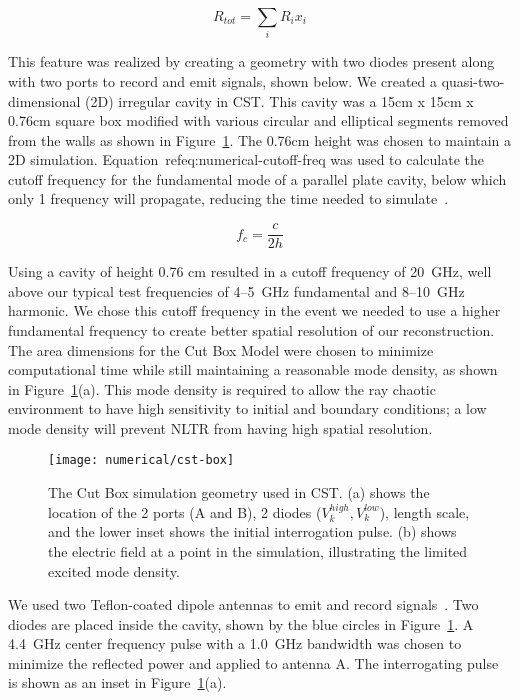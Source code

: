 \begin{equation}
R_{tot} = \sum_{i} R_{i}x_{i}
\label{eq:numerical-r-tot}
\end{equation}

This feature was realized by creating a geometry with two diodes present along with two ports to record and emit signals, shown below. We created a quasi-two-dimensional (2D) irregular cavity in CST. This cavity was a 15cm x 15cm x 0.76cm square box modified with various circular and elliptical segments removed from the walls as shown in Figure~\ref{fig:numerical-cst-box}.  The 0.76cm height was chosen to maintain a 2D simulation. Equation~ref{eq:numerical-cutoff-freq} was used to calculate the cutoff frequency for the fundamental mode of a parallel plate cavity, below which only 1 frequency will propagate, reducing the time needed to simulate~\cite{griffiths_david_introduction_1999}.

\begin{equation}
f_c = \frac{c}{2h}
\label{eq:numerical-cutoff-freq}
\end{equation}

Using a cavity of height 0.76 cm resulted in a cutoff frequency of 20~GHz, well above our typical test frequencies of \numrange{4}{5}~GHz fundamental and \numrange{8}{10}~GHz harmonic. We chose this cutoff frequency in the event we needed to use a higher fundamental frequency to create better spatial resolution of our reconstruction. The area dimensions for the Cut Box Model were chosen to minimize computational time while still maintaining a reasonable mode density, as shown in Figure~\ref{fig:numerical-cst-box}(a). This mode density is required to allow the ray chaotic environment to have high sensitivity to initial and boundary conditions; a low mode density will prevent NLTR from having high spatial resolution.

\begin{figure}[t]
\centering
\texttt{[image: numerical/cst-box]}
\caption[The Cut Box Model]{The Cut Box simulation geometry used in CST. (a) shows the location of the 2 ports (A and B), 2 diodes ($V_k^{high}, V_k^{low}$), length scale, and the lower inset shows the initial interrogation pulse. (b) shows the electric field at a point in the simulation, illustrating the limited excited mode density.}
\label{fig:numerical-cst-box}
\end{figure}

We used two Teflon-coated dipole antennas to emit and record signals~\cite{hemmady2006universal}. Two diodes are placed inside the cavity, shown by the blue circles in Figure~\ref{fig:numerical-cst-box}. A 4.4~GHz center frequency pulse with a 1.0~GHz bandwidth was chosen to minimize the reflected power and applied to antenna A. The interrogating pulse is shown as an inset in Figure~\ref{fig:numerical-cst-box}(a).

